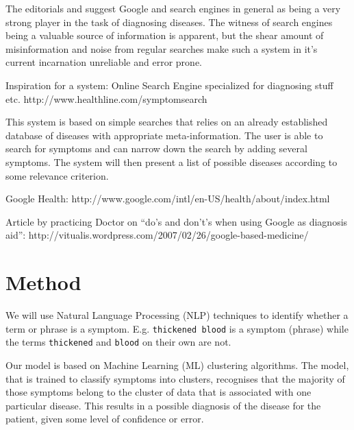 \documentclass[10pt,letterpaper,final]{article}
\begin{document}
The editorials \cite{googlechangemedicine} and
\cite{diagnosissearchengines} suggest Google and search engines in
general as being a very strong player in the task of diagnosing
diseases. The witness of search engines being a valuable source of
information is apparent, but the shear amount of misinformation and
noise from regular searches make such a system in it’s current
incarnation unreliable and error prone.


Inspiration for a system: Online Search Engine specialized for
diagnosing stuff etc.
http://www.healthline.com/symptomsearch

This system is based on simple searches that relies on an already
established database of diseases with appropriate meta-information. The
user is able to search for symptoms and can narrow down the search by
adding several symptoms. The system will then present a list of possible
diseases according to some relevance criterion.



Google Health: http://www.google.com/intl/en-US/health/about/index.html


Article by practicing Doctor on “do’s and don’t’s when using Google as
diagnosis aid”:
http://vitualis.wordpress.com/2007/02/26/google-based-medicine/


\section{Method}
We will use Natural Language Processing (NLP) techniques to identify
whether a term or phrase is a symptom. E.g. \texttt{thickened blood} is
a symptom (phrase) while the terms \texttt{thickened} and \texttt{blood}
on their own are not.

Our model is based on Machine Learning (ML) clustering algorithms. The
model, that is trained to classify symptoms into clusters, recognises
that the majority of those symptoms belong to the cluster of data that
is associated with one particular disease. This results in a possible
diagnosis of the disease for the patient, given some level of confidence
or error.
\end{document}

